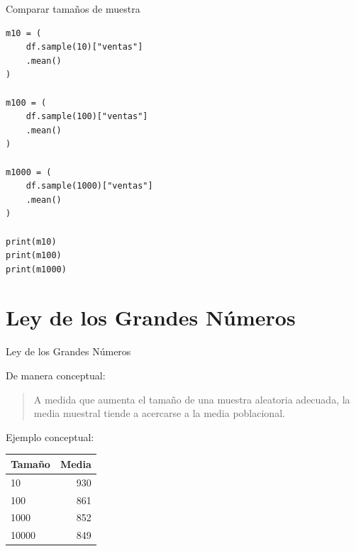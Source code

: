 \documentclass[aspectratio=169,11pt]{beamer}
\begin{document}

\begin{frame}[fragile]{Comparar tamaños de muestra}

\begin{lstlisting}
m10 = (
    df.sample(10)["ventas"]
    .mean()
)

m100 = (
    df.sample(100)["ventas"]
    .mean()
)

m1000 = (
    df.sample(1000)["ventas"]
    .mean()
)

print(m10)
print(m100)
print(m1000)
\end{lstlisting}

\end{frame}

\section{Ley de los Grandes Números}

\begin{frame}{Ley de los Grandes Números}

De manera conceptual:

\begin{quote}

A medida que aumenta el tamaño de una muestra aleatoria adecuada,
la media muestral tiende a acercarse a la media poblacional.

\end{quote}

Ejemplo conceptual:

\begin{center}

\begin{tabular}{lr}
\toprule

Tamaño &
Media \\

\midrule

10 &
930 \\

100 &
861 \\

1000 &
852 \\

10000 &
849 \\

\bottomrule

\end{tabular}

\end{center}

\end{frame}
\end{document}
